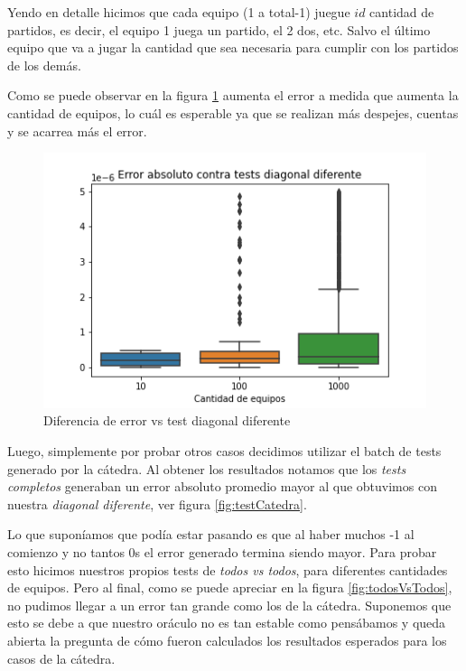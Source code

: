 Yendo en detalle hicimos que cada equipo (1 a total-1) juegue $id$ cantidad de partidos, es decir, el equipo 1 juega un partido, el 2 dos, etc. Salvo el último equipo que va a jugar la cantidad que sea necesaria para cumplir con los partidos de los demás.

Como se puede observar en la figura \ref{fig:bienDiferenteEnDiagonal} aumenta el error a medida que aumenta la cantidad de equipos, lo cuál es esperable ya que se realizan más despejes, cuentas y se acarrea más el error.

\begin{figure}[H]
 \centering
 \includegraphics[scale=0.7]{imagenes/bienDiferenteEnDiagonal.png}
 \caption{Diferencia de error vs test diagonal diferente}
 \label{fig:bienDiferenteEnDiagonal}
\end{figure}

Luego, simplemente por probar otros casos decidimos utilizar el batch de tests generado por la cátedra. Al obtener los resultados notamos que los \textit{tests completos} generaban un error absoluto promedio mayor al que obtuvimos con nuestra \textit{diagonal diferente}, ver figura \ref{fig:testCatedra}.

Lo que suponíamos que podía estar pasando es que al haber muchos -1 al comienzo y no tantos 0s el error generado termina siendo mayor. Para probar esto hicimos nuestros propios tests de \textit{todos vs todos}, para diferentes cantidades de equipos. Pero al final, como se puede apreciar en la figura \ref{fig:todosVsTodos}, no pudimos llegar a un error tan grande como los de la cátedra. Suponemos que esto se debe a que nuestro oráculo no es tan estable como pensábamos y queda abierta la pregunta de cómo fueron calculados los resultados esperados para los casos de la cátedra.

